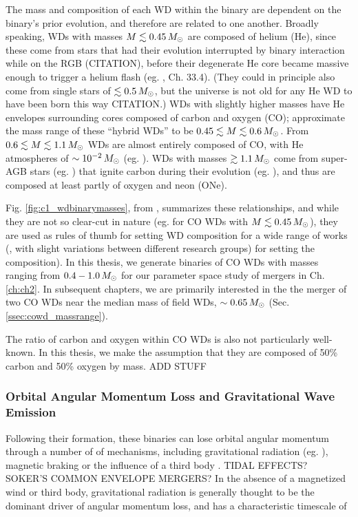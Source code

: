 The mass and composition of each WD within the binary are dependent on the binary's prior evolution, and therefore are related to one another.  Broadly speaking, WDs with masses $M \lesssim 0.45\,\Msun$ are composed of helium (He), since these come from stars that had their evolution interrupted by binary interaction while on the RGB ({\charles CITATION}), before their degenerate He core became massive enough to trigger a helium flash (eg. \cite{kippww12}, Ch. 33.4).  (They could in principle also come from single stars of $\lesssim0.5\,\Msun$, but the universe is not old for any He WD to have been born this way {\charles CITATION}.)  WDs with slightly higher masses have He envelopes surrounding cores composed of carbon and oxygen (CO); \cite{dan+12} approximate the mass range of these ``hybrid WDs'' to be $0.45 \lesssim M \lesssim 0.6\,\Msun$.  From $0.6 \lesssim M \lesssim 1.1\,\Msun$ WDs are almost entirely composed of CO, with He atmospheres of $\sim10^{-2}\,\Msun$ (eg. \citealt{ibent85}).  WDs with masses $\gtrsim 1.1\,\Msun$ come from super-AGB stars (eg. \citealt{herw05}) that ignite carbon during their evolution (eg. \citealt{garc13}), and thus are composed at least partly of oxygen and neon (ONe).  

Fig. \ref{fig:c1_wdbinarymasses}, from \cite{dan+12}, summarizes these relationships, and while they are not so clear-cut in nature (eg. \citealt{ibent85, moros09} for CO WDs with $M\lesssim0.45\,\Msun$), they are used as rules of thumb for setting WD composition for a wide range of works (\citealt{loreig09,rask+12,dan+12,dan+14,}, with slight variations between different research groups) for setting the composition).  In this thesis, we generate binaries of CO WDs with masses ranging from $0.4 - 1.0\,\Msun$ for our parameter space study of mergers in Ch. \ref{ch:ch2}.  In subsequent chapters, we are primarily interested in the the merger of two CO WDs near the median mass of field WDs, $\sim0.65\,\Msun$ (Sec. \ref{ssec:cowd_massrange}).

The ratio of carbon and oxygen within CO WDs is also not particularly well-known.  In this thesis, we make the assumption that they are composed of 50\% carbon and 50\% oxygen by mass.  {\charles ADD STUFF}

\subsubsection{Orbital Angular Momentum Loss and Gravitational Wave Emission}

Following their formation, these binaries can lose orbital angular momentum through a number of of mechanisms, including gravitational radiation (eg. \citealt{XXX}), magnetic braking \citep{XXX} or the influence of a third body \citep{XXX}.  {\charles TIDAL EFFECTS?  SOKER'S COMMON ENVELOPE MERGERS?}  In the absence of a magnetized wind or third body, gravitational radiation is generally thought to be the dominant driver of angular momentum loss, and has a characteristic timescale of \citep{segrcm97}

